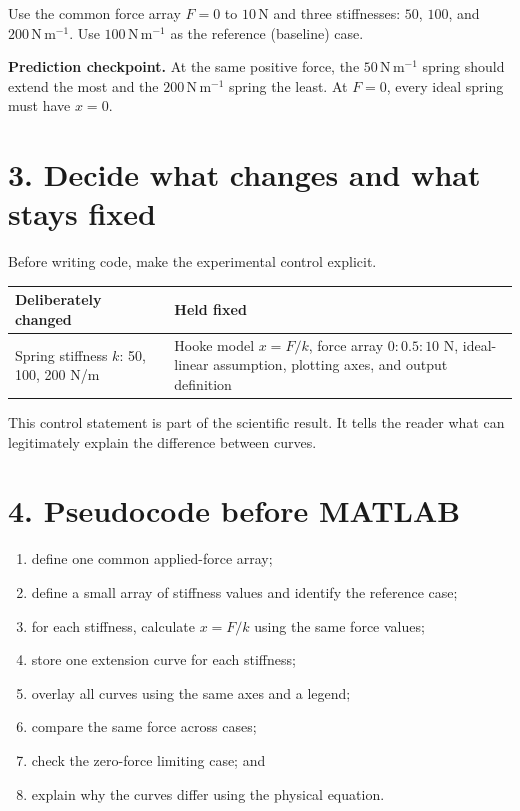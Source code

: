 \documentclass[11pt,a4paper]{article}
\newcommand{\units}[1]{\,\mathrm{#1}}
\begin{document}
Use the common force array $F=0$ to $10\units{N}$ and three stiffnesses: $50$, $100$, and $200\units{N\,m^{-1}}$. Use $100\units{N\,m^{-1}}$ as the reference (baseline) case.

\begin{checkbox}\textbf{Prediction checkpoint.} At the same positive force, the $50\units{N\,m^{-1}}$ spring should extend the most and the $200\units{N\,m^{-1}}$ spring the least. At $F=0$, every ideal spring must have $x=0$.\end{checkbox}

\section*{3. Decide what changes and what stays fixed}
Before writing code, make the experimental control explicit.

\begin{center}\small
\begin{tabular}{>{\raggedright\arraybackslash}p{.30\linewidth}>{\raggedright\arraybackslash}p{.54\linewidth}}
\toprule
\textbf{Deliberately changed} & \textbf{Held fixed}\\
\midrule
Spring stiffness $k$: 50, 100, 200 N/m & Hooke model $x=F/k$, force array $0:0.5:10$ N, ideal-linear assumption, plotting axes, and output definition\\
\bottomrule
\end{tabular}
\end{center}

This control statement is part of the scientific result. It tells the reader what can legitimately explain the difference between curves.

\section*{4. Pseudocode before MATLAB}
\begin{enumerate}[nosep,leftmargin=7mm]
\item define one common applied-force array;
\item define a small array of stiffness values and identify the reference case;
\item for each stiffness, calculate $x=F/k$ using the same force values;
\item store one extension curve for each stiffness;
\item overlay all curves using the same axes and a legend;
\item compare the same force across cases;
\item check the zero-force limiting case; and
\item explain why the curves differ using the physical equation.
\end{enumerate}
\end{document}
